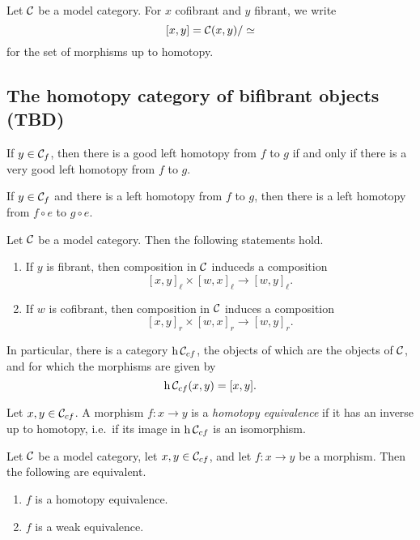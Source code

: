 \begin{notation}
	Let \(\mathcal{C}\) be a model category. For \(x\) cofibrant and \(y\) fibrant, we write
	\[ [x,y] = \mathcal{C}(x,y)/\simeq \]
	for the set of morphisms up to homotopy.
\end{notation}

\subsection{The homotopy category of bifibrant objects (TBD)}

\begin{lemma}
	If \(y\in\mathcal{C}_f\), then there is a good left homotopy from \(f\) to \(g\) if and only if there is a very good left homotopy from \(f\) to \(g\).
\end{lemma}
\begin{proposition}
	If \(y\in\mathcal{C}_f\) and there is a left homotopy from \(f\) to \(g\), then there is a left homotopy from \(f\circ e\) to \(g\circ e\).
\end{proposition}
\begin{propositiondef}
	Let \(\mathcal{C}\) be a model category. Then the following statements hold.
	\begin{enumerate}[label=(\arabic*)]
		\item If \(y\) is fibrant, then composition in \(\mathcal{C}\) induceds a composition
			\[ [x,y]_\ell \times [w,x]_\ell \to [w,y]_\ell. \]
		\item If \(w\) is cofibrant, then composition in \(\mathcal{C}\) induces a composition
			\[ [x,y]_r \times [w,x]_r \to [w,y]_r. \]
	\end{enumerate}
	In particular, there is a category \(\operatorname{h}{\mathcal{C}_{cf}}\), the objects of which are the objects of \(\mathcal{C}\), and for which the morphisms are given by
	\[ \operatorname{h}{\mathcal{C}_{cf}}(x,y) = [x,y]. \]
\end{propositiondef}

\begin{terminology}
	Let \(x,y\in\mathcal{C}_{cf}\). A morphism \(f\!:x\to y\) is a \emph{homotopy equivalence} if it has an inverse up to homotopy, i.e.\ if its image in \(\operatorname{h}{\mathcal{C}_{cf}}\)
	is an isomorphism.
\end{terminology}

\begin{theorem}
	Let \(\mathcal{C}\) be a model category, let \(x,y\in\mathcal{C}_{cf}\), and let \(f\!:x\to y\) be a morphism. Then the following are equivalent.
	\begin{enumerate}[label=(\arabic*)]
		\item \(f\) is a homotopy equivalence.
		\item \(f\) is a weak equivalence.
	\end{enumerate}
\end{theorem}

